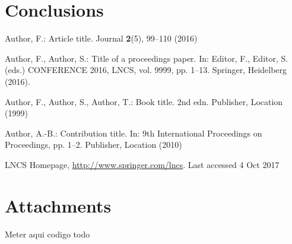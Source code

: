 \documentclass[runningheads]{llncs}
\begin{document}
\section{Conclusions}
\label{sec:conclusions}

%
%
%
% 
% 
%
\begin{thebibliography}{8}
	Author, F.: Article title. Journal \textbf{2}(5), 99--110 (2016)
	
	Author, F., Author, S.: Title of a proceedings paper. In: Editor,
	F., Editor, S. (eds.) CONFERENCE 2016, LNCS, vol. 9999, pp. 1--13.
	Springer, Heidelberg (2016). 
	
	Author, F., Author, S., Author, T.: Book title. 2nd edn. Publisher,
	Location (1999)
	
	Author, A.-B.: Contribution title. In: 9th International Proceedings
	on Proceedings, pp. 1--2. Publisher, Location (2010)
	
	LNCS Homepage, \url{http://www.springer.com/lncs}. Last accessed 4
	Oct 2017
\end{thebibliography}

\newpage

\section{Attachments}
\label{sec:attachments}
Meter aqui codigo todo
\end{document}
